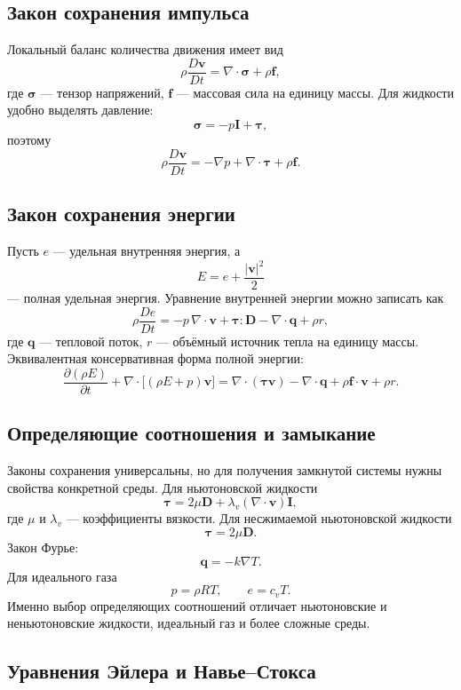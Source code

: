 \subsection{Закон сохранения импульса}

Локальный баланс количества движения имеет вид
\[
\boxed{
\rho\frac{D\mathbf v}{Dt}
=\nabla\cdot\boldsymbol\sigma+\rho\mathbf f,
}
\]
где $\boldsymbol\sigma$ --- тензор напряжений, $\mathbf f$ --- массовая
сила на единицу массы. Для жидкости удобно выделять давление:
\[
\boldsymbol\sigma=-p\mathbf I+\boldsymbol\tau,
\]
поэтому
\[
\rho\frac{D\mathbf v}{Dt}
=-\nabla p+\nabla\cdot\boldsymbol\tau+\rho\mathbf f.
\]

\subsection{Закон сохранения энергии}

Пусть $e$ --- удельная внутренняя энергия, а
\[
E=e+\frac{|\mathbf v|^2}{2}
\]
--- полная удельная энергия. Уравнение внутренней энергии можно записать как
\[
\boxed{
\rho\frac{De}{Dt}
=-p\,\nabla\cdot\mathbf v
+\boldsymbol\tau:\mathbf D
-\nabla\cdot\mathbf q
+\rho r,
}
\]
где $\mathbf q$ --- тепловой поток, $r$ --- объёмный источник тепла на
единицу массы. Эквивалентная консервативная форма полной энергии:
\[
\frac{\partial(\rho E)}{\partial t}
+\nabla\cdot\bigl[(\rho E+p)\mathbf v\bigr]
=\nabla\cdot(\boldsymbol\tau\mathbf v)
-\nabla\cdot\mathbf q
+\rho\mathbf f\cdot\mathbf v+\rho r.
\]

\subsection{Определяющие соотношения и замыкание}

Законы сохранения универсальны, но для получения замкнутой системы нужны
свойства конкретной среды. Для ньютоновской жидкости
\[
\boxed{
\boldsymbol\tau
=2\mu\mathbf D
+\lambda_v(\nabla\cdot\mathbf v)\mathbf I,
}
\]
где $\mu$ и $\lambda_v$ --- коэффициенты вязкости. Для несжимаемой
ньютоновской жидкости
\[
\boldsymbol\tau=2\mu\mathbf D.
\]
Закон Фурье:
\[
\boxed{\mathbf q=-k\nabla T}.
\]
Для идеального газа
\[
\boxed{p=\rho RT},
\qquad
e=c_vT.
\]
Именно выбор определяющих соотношений отличает ньютоновские и
неньютоновские жидкости, идеальный газ и более сложные среды.

\subsection{Уравнения Эйлера и Навье--Стокса}

